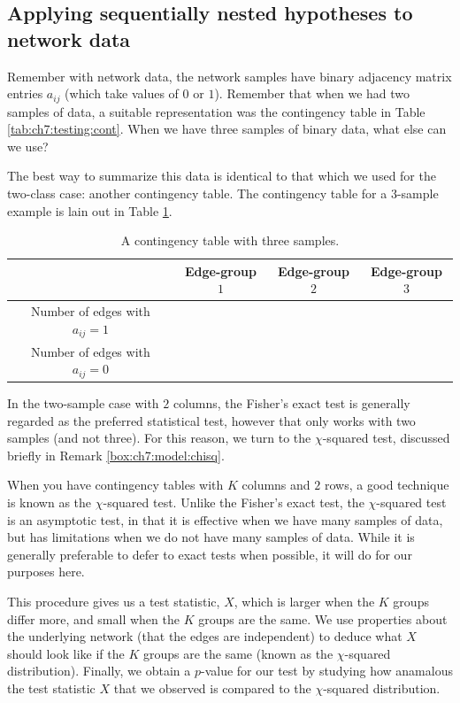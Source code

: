 \subsection{Applying sequentially nested hypotheses to network data}

Remember with network data, the network samples have binary adjacency matrix entries $a_{ij}$ (which take values of $0$ or $1$). Remember that when we had two samples of data, a suitable representation was the contingency table in Table \ref{tab:ch7:testing:cont}. When we have three samples of binary data, what else can we use?

The best way to summarize this data is identical to that which we used for the two-class case: another contingency table. The contingency table for a $3$-sample example is lain out in Table \ref{tab:ch7:model:cont}.

\begin{table}[h]
    \centering
    \begin{tabular}{c | c|c|c}
         & Edge-group $1$ & Edge-group $2$ & Edge-group $3$ \\
         \hline
         Number of edges with $a_{ij} = 1$ & &  & \\
         Number of edges with $a_{ij} = 0$ & &  &
    \end{tabular}
    \caption{A contingency table with three samples.}
    \label{tab:ch7:model:cont}
\end{table}

In the two-sample case with $2$ columns, the Fisher's exact test is generally regarded as the preferred statistical test, however that only works with two samples (and not three). For this reason, we turn to the $\chi$-squared test, discussed briefly in Remark \ref{box:ch7:model:chisq}.

\begin{floatingbox}[h]\caption{The $\chi$-squared test for $2 \times K$ contingency tables}
\label{box:ch7:model:chisq}
When you have contingency tables with $K$ columns and $2$ rows, a good technique is known as the $\chi$-squared test. Unlike the Fisher's exact test, the $\chi$-squared test is an asymptotic test, in that it is effective when we have many samples of data, but has limitations when we do not have many samples of data. While it is generally preferable to defer to exact tests when possible, it will do for our purposes here. 

This procedure gives us a test statistic, $X$, which is larger when the $K$ groups differ more, and small when the $K$ groups are the same. We use properties about the underlying network (that the edges are independent) to deduce what $X$ should look like if the $K$ groups are the same (known as the $\chi$-squared distribution). Finally, we obtain a $p$-value for our test by studying how anamalous the test statistic $X$ that we observed is compared to the $\chi$-squared distribution.
\end{floatingbox}

